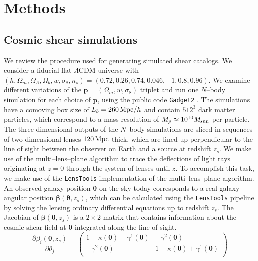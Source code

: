 \documentclass[reprint,aps,prd,superscriptaddress,showkeys,showpacs]{revtex4-1}
\newcommand{\bb}[1]{\mathbf{#1}}
\newcommand{\ttt}[1]{\texttt{#1}}
\begin{document}

\section{Methods}


\subsection{Cosmic shear simulations}
\label{sec:shearsim}
We review the procedure used for generating simulated shear catalogs. We consider a fiducial flat $\Lambda$CDM universe with $(h,\Omega_m,\Omega_\Lambda,\Omega_b,w,\sigma_8,n_s)=(0.72,0.26,0.74,0.046,-1,0.8,0.96)$. We examine different variations of the $\bb{p}=(\Omega_m,w,\sigma_8)$ triplet and run one $N$--body simulation for each choice of $\bb{p}$, using the public code \ttt{Gadget2} \citep{Gadget2}. The simulations have a comoving box size of $L_b=260\,{\rm Mpc}/h$ and contain $512^3$ dark matter particles, which correspond to a mass resolution of $M_p\approx 10^{10}M_{\rm sun}$ per particle. The three dimensional outputs of the $N$--body simulations are sliced in sequences of two dimensional lenses $120 \,{\rm Mpc}$ thick, which are lined up perpendicular to the line of sight between the observer on Earth and a source at redshift $z_s$. We make use of the multi--lens--plane algorithm \citep{RayTracingJain,RayTracingHartlap} to trace the deflections of light rays originating at $z=0$ through the system of lenses until $z$. To accomplish this task, we make use of the \ttt{LensTools} \citep{LensTools-ASCL,LensTools-paper} implementation of the multi--lens--plane algorithm. An observed galaxy position $\pmb{\theta}$ on the sky today corresponds to a real galaxy angular position $\pmb{\beta}(\pmb{\theta},z_s)$, which can be calculated using the \ttt{LensTools} pipeline by solving the lensing ordinary differential equations up to redshift $z_s$. The Jacobian of $\pmb{\beta}(\pmb{\theta},z_s)$ is a $2\times 2$ matrix that contains information about the cosmic shear field at $\pmb{\theta}$ integrated along the line of sight. 
%
\begin{equation}
\label{meth:sheareqn}
\frac{\partial\beta_i(\pmb{\theta},z_s)}{\partial \theta_j} = 
\begin{pmatrix}
1-\kappa(\pmb{\theta})-\gamma^1(\pmb{\theta}) & -\gamma^2(\pmb{\theta}) \\
-\gamma^2(\pmb{\theta}) & 1-\kappa(\pmb{\theta})+\gamma^1(\pmb{\theta})\\
\end{pmatrix}
\end{equation}  
\end{document}
